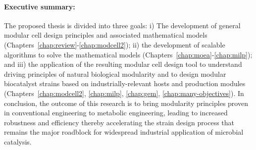 \paragraph{Executive summary:}
The proposed thesis is divided into three goals:
i) The development of general modular cell design principles and associated mathematical models (Chapters~\ref{chap:review}-\ref{chap:modcell2});
ii) the development of scalable algorithms to solve the mathematical models (Chapters~\ref{chap:moea}-\ref{chap:milp});
and iii) the application of the resulting modular cell design tool to understand driving principles of natural biological modularity and to design modular biocatalyst strains based on industrially-relevant hosts and production modules (Chapters~\ref{chap:modcell2}, \ref{chap:milp}, \ref{chap:gem}, \ref{chap:many-objectives}).
In conclusion, the outcome of this research is to bring modularity principles proven in conventional engineering to metabolic engineering, leading to increased robustness and efficiency thereby accelerating the strain design process that remains the major roadblock for widespread industrial application of microbial catalysis.



